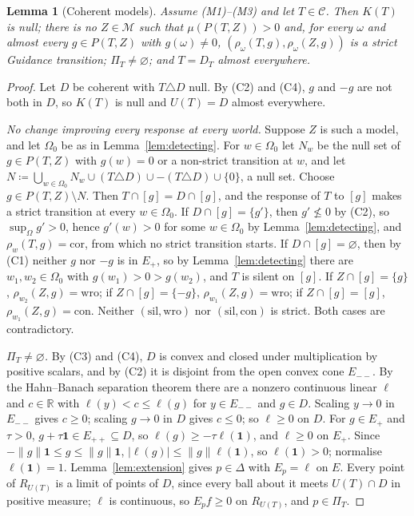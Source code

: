 \documentclass[11pt]{article}
\newtheorem{lemma}[theorem]{Lemma}
\theoremstyle{definition}
\theoremstyle{remark}
\newcommand{\M}{\mathcal M}
\newcommand{\C}{\mathcal C}
\newcommand{\one}{\mathbf 1}
\newcommand{\R}{\mathbb R}
\newcommand{\cor}{\mathrm{cor}}
\newcommand{\sil}{\mathrm{sil}}
\newcommand{\wro}{\mathrm{wro}}
\newcommand{\con}{\mathrm{con}}
\begin{document}
\begin{lemma}[Coherent models]\label{lem:coherent}
Assume (M1)--(M3) and let $T\in\C$. Then $K(T)$ is null; there is no $Z\in\M$ such that $\mu(P(T,Z))>0$ and, for every $\omega$ and almost every $g\in P(T,Z)$ with $g(\omega)\ne0$, $(\rho_\omega(T,g),\rho_\omega(Z,g))$ is a strict Guidance transition; $\Pi_T\ne\varnothing$; and $T=D_T$ almost everywhere.
\end{lemma}
\begin{proof}
Let $D$ be coherent with $T\triangle D$ null. By (C2) and (C4), $g$ and $-g$ are not both in $D$, so $K(T)$ is null and $U(T)=D$ almost everywhere.

\emph{No change improving every response at every world.} Suppose $Z$ is such a model, and let $\Omega_0$ be as in Lemma~\ref{lem:detecting}. For $w\in\Omega_0$ let $N_w$ be the null set of $g\in P(T,Z)$ with $g(w)=0$ or a non-strict transition at $w$, and let $N\coloneqq\bigcup_{w\in\Omega_0}N_w\cup(T\triangle D)\cup-(T\triangle D)\cup\{0\}$, a null set. Choose $g\in P(T,Z)\setminus N$. Then $T\cap[g]=D\cap[g]$, and the response of $T$ to $[g]$ makes a strict transition at every $w\in\Omega_0$. If $D\cap[g]=\{g'\}$, then $g'\not\le0$ by (C2), so $\sup_\Omega g'>0$, hence $g'(w)>0$ for some $w\in\Omega_0$ by Lemma~\ref{lem:detecting}, and $\rho_w(T,g)=\cor$, from which no strict transition starts. If $D\cap[g]=\varnothing$, then by (C1) neither $g$ nor $-g$ is in $E_+$, so by Lemma~\ref{lem:detecting} there are $w_1,w_2\in\Omega_0$ with $g(w_1)>0>g(w_2)$, and $T$ is silent on $[g]$. If $Z\cap[g]=\{g\}$, $\rho_{w_2}(Z,g)=\wro$; if $Z\cap[g]=\{-g\}$, $\rho_{w_1}(Z,g)=\wro$; if $Z\cap[g]=[g]$, $\rho_{w_1}(Z,g)=\con$. Neither $(\sil,\wro)$ nor $(\sil,\con)$ is strict. Both cases are contradictory.

\emph{$\Pi_T\ne\varnothing$.} By (C3) and (C4), $D$ is convex and closed under multiplication by positive scalars, and by (C2) it is disjoint from the open convex cone $E_{--}$. By the Hahn--Banach separation theorem there are a nonzero continuous linear $\ell$ and $c\in\R$ with $\ell(y)<c\le\ell(g)$ for $y\in E_{--}$ and $g\in D$. Scaling $y\to0$ in $E_{--}$ gives $c\ge0$; scaling $g\to0$ in $D$ gives $c\le0$; so $\ell\ge0$ on $D$. For $g\in E_+$ and $\tau>0$, $g+\tau\one\in E_{++}\subseteq D$, so $\ell(g)\ge-\tau\ell(\one)$, and $\ell\ge0$ on $E_+$. Since $-\|g\|\one\le g\le\|g\|\one$, $|\ell(g)|\le\|g\|\ell(\one)$, so $\ell(\one)>0$; normalise $\ell(\one)=1$. Lemma~\ref{lem:extension} gives $p\in\Delta$ with $E_p=\ell$ on $E$. Every point of $R_{U(T)}$ is a limit of points of $D$, since every ball about it meets $U(T)\cap D$ in positive measure; $\ell$ is continuous, so $E_pf\ge0$ on $R_{U(T)}$, and $p\in\Pi_T$.


\end{proof}
\end{document}
